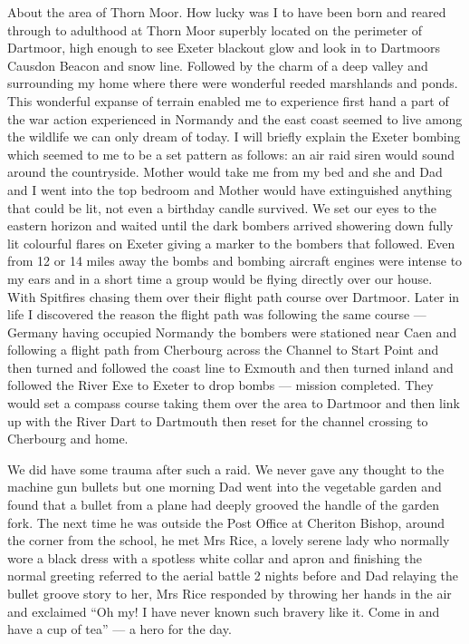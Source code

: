 About the area of Thorn Moor.  How lucky was I to have been born and reared
through to adulthood at Thorn Moor superbly located on the perimeter of
Dartmoor, high enough to see Exeter blackout glow and look in to Dartmoors
Causdon Beacon and snow line.  Followed by the charm of a deep valley and
surrounding my home where there were wonderful reeded marshlands and ponds.
This wonderful expanse of terrain enabled me to experience first hand a part of
the war action experienced in Normandy and the east coast seemed to live among
the wildlife we can only dream of today. I will briefly explain the Exeter
bombing which seemed to me to be a set pattern as follows:  an air raid siren
would sound around the countryside.  Mother would take me from my bed and she
and Dad and I went into the top bedroom and Mother would have extinguished
anything that could be lit, not even a birthday candle survived.  We set our
eyes to the eastern horizon and waited until the dark bombers arrived showering
down fully lit colourful flares on Exeter giving a marker to the bombers that
followed.  Even from 12 or 14 miles away the bombs and bombing aircraft engines
were intense to my ears and in a short time a group would be flying directly
over our house.  With Spitfires chasing them over their flight path course over
Dartmoor.  Later in life I discovered the reason the flight path was following
the same course --- Germany having occupied Normandy the bombers were stationed
near Caen and following a flight path from Cherbourg across the Channel to
Start Point and then turned and followed the coast line to Exmouth and then
turned inland and followed the River Exe to Exeter to drop bombs --- mission
completed.  They would set a compass course taking them over the area to
Dartmoor and then link up with the River Dart to Dartmouth then reset for the
channel crossing to Cherbourg and home.

We did have some trauma after such a raid.  We never gave any thought to the
machine gun bullets but one morning Dad went into the vegetable garden and
found that a bullet from a plane had deeply grooved the handle of the garden
fork.  The next time he was outside the Post Office at Cheriton Bishop, around
the corner from the school, he met Mrs Rice, a lovely serene lady who normally
wore a black dress with a spotless white collar and apron and finishing the
normal greeting referred to the aerial battle 2 nights before and Dad relaying
the bullet groove story to her, Mrs Rice responded by throwing her hands in the
air and exclaimed ``Oh my!  I have never known such bravery like it.  Come in
and have a cup of tea'' --- a hero for the day.

